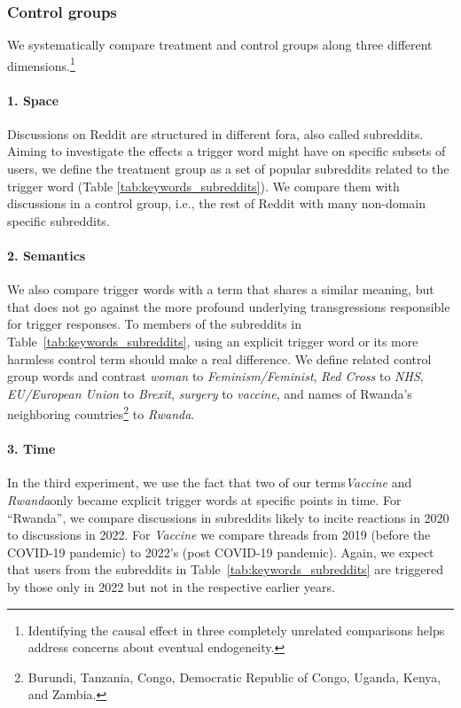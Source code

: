 \subsubsection{Control groups}

We systematically compare treatment and control groups along three different dimensions.\footnote{Identifying the causal effect in three completely unrelated comparisons helps address concerns about eventual endogeneity.}

\paragraph{1. Space}
Discussions on Reddit are structured in different fora, also called subreddits. Aiming to investigate the effects a trigger word might have on specific subsets of users, we define the treatment group as a set of popular subreddits related to the trigger word (Table \ref{tab:keywords_subreddits}). We compare them with discussions in a control group, i.e., the rest of Reddit with many non-domain specific subreddits. 



\paragraph{2. Semantics} 
We also compare trigger words with a term that shares a similar meaning, but that does not go against the more profound underlying transgressions responsible for trigger responses. To members of the subreddits in Table~\ref{tab:keywords_subreddits}, using an explicit trigger word or its more harmless control term should make a real difference. We define related control group words and contrast \textit{woman} to \textit{Feminism/Feminist}, \textit{Red Cross} to \textit{NHS}, \textit{EU/European Union} to \textit{Brexit}, \textit{surgery} to \textit{vaccine}, and names of Rwanda's neighboring countries\footnote{Burundi, Tanzania, Congo, Democratic Republic of Congo, Uganda, Kenya, and Zambia.} to \textit{Rwanda}. 


\paragraph{3. Time}
In the third experiment, we use the fact that two of our terms\textemdash \textit{Vaccine} and \textit{Rwanda}\textemdash only became explicit trigger words at specific points in time. For ``Rwanda'', we compare discussions in subreddits likely to incite reactions in 2020 to discussions in 2022. For \textit{Vaccine} we compare threads from 2019 (before the COVID-19 pandemic) to 2022's (post COVID-19 pandemic). Again, we expect that users from the subreddits in Table~\ref{tab:keywords_subreddits} are triggered by those only in 2022 but not in the respective earlier years.


